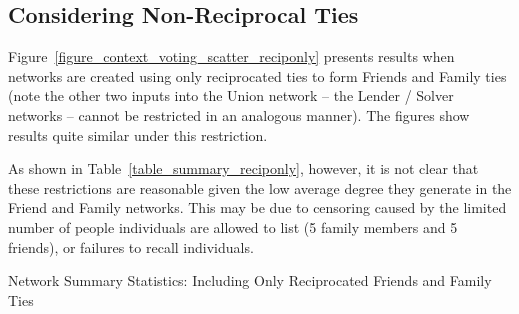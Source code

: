 \documentclass[12pt]{article}
\begin{document}
\begin{appendix}
\section{Considering Non-Reciprocal Ties}\label{appendix_reciponly}

Figure~\ref{figure_context_voting_scatter_reciponly} presents results when networks are created using only reciprocated ties to form Friends and Family ties (note the other two inputs into the Union network -- the Lender / Solver networks -- cannot be restricted in an analogous manner). The figures show results quite similar under this restriction.

As shown in Table~\ref{table_summary_reciponly}, however, it is not clear that these restrictions are reasonable given the low average degree they generate in the Friend and Family networks. This may be due to censoring caused by the limited number of people individuals are allowed to list (5 family members and 5 friends), or failures to recall individuals.

\begin{table}
\centering
\caption{Network Summary Statistics: Including Only Reciprocated Friends and Family Ties }\label{table_summary_reciponly}

\end{table}



\end{appendix}
\end{document}
